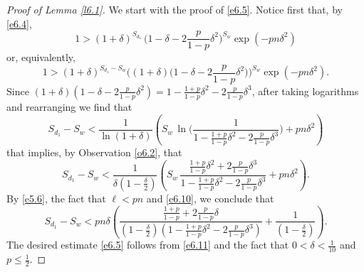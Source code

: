 \documentclass[10pt]{amsart}
\theoremstyle{remark}
\newcommand{\mik}{\leqslant}
\begin{document}
\begin{proof}[Proof of Lemma \emph{\ref{l6.1}}]
We start with the proof of \eqref{e6.5}. Notice first that, by \eqref{e6.4},
\begin{equation} \label{e6.7}
1 > (1+\delta)^{S_{d_1}} \, \Big(1-\delta-2\frac{p}{1-p}\delta^2\Big)^{S_w}\exp(-pn\delta^2)
\end{equation}
or, equivalently,
\begin{equation} \label{e6.8}
1 >(1+\delta)^{S_{d_1}-S_w}
\Big((1+\delta) \big(1-\delta-2\frac{p}{1-p}\delta^2\big)\Big)^{S_w} \exp(-pn\delta^2).
\end{equation}
Since $(1+\delta)(1-\delta-2\frac{p}{1-p}\delta^2)=1-\frac{1+p}{1-p}\delta^2-2\frac{p}{1-p}\delta^3$,
after taking logarithms and rearranging we find that
\begin{equation} \label{e6.9}
S_{d_1}-S_w < \frac{1}{\ln(1+\delta)}
\left(S_w\, \ln\Big(\frac{1}{1-\frac{1+p}{1-p}\delta^2-2\frac{p}{1-p}\delta^3}\Big)+pn\delta^2\right)
\end{equation}
that implies, by Observation \ref{o6.2}, that
\begin{equation} \label{e6.10}
S_{d_1}-S_w < \frac{1}{\delta(1-\frac{\delta}{2})} \left( S_w \, \frac{\frac{1+p}{1-p}\delta^2+2\frac{p}{1-p}\delta^3}{1-\frac{1+p}{1-p}\delta^2-2\frac{p}{1-p}\delta^3}
+pn\delta^2\right).
\end{equation}
By \eqref{e5.6}, the fact that $\ell< pn$ and \eqref{e6.10}, we conclude that
\begin{equation} \label{e6.11}
S_{d_1}-S_w<pn\delta \left(\frac{\frac{1+p}{1-p}+2\frac{p}{1-p}\delta}{\left(1-\frac{\delta}{2}\right)
\left(1-\frac{1+p}{1-p}\delta^2-2\frac{p}{1-p}\delta^3\right)}+\frac{1}{\left(1-\frac{\delta}{2}\right)}\right).
\end{equation}
The desired estimate \eqref{e6.5} follows from \eqref{e6.11} and the fact that $0<\delta<\frac{1}{10}$ and $p\mik \frac12$.


\end{proof}
\end{document}
